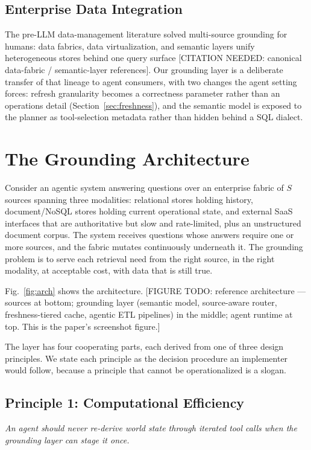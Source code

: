 \documentclass{ieeeaccess}
\begin{document}
\subsection{Enterprise Data Integration}
The pre-LLM data-management literature solved multi-source grounding for humans:
data fabrics, data virtualization, and semantic layers unify heterogeneous stores
behind one query surface [CITATION NEEDED: canonical data-fabric / semantic-layer
references]. Our grounding layer is a deliberate transfer of that lineage to agent
consumers, with two changes the agent setting forces: refresh granularity becomes a
correctness parameter rather than an operations detail (Section~\ref{sec:freshness}),
and the semantic model is exposed to the planner as tool-selection metadata rather
than hidden behind a SQL dialect.

\section{The Grounding Architecture}
\label{sec:framework}

Consider an agentic system answering questions over an enterprise fabric of $S$
sources spanning three modalities: relational stores holding history, document/NoSQL
stores holding current operational state, and external SaaS interfaces that are
authoritative but slow and rate-limited, plus an unstructured document corpus. The
system receives questions whose answers require one or more sources, and the fabric
mutates continuously underneath it. The grounding problem is to serve each retrieval
need from the right source, in the right modality, at acceptable cost, with data that
is still true.

Fig.~\ref{fig:arch} shows the architecture. [FIGURE TODO: reference architecture ---
sources at bottom; grounding layer (semantic model, source-aware router,
freshness-tiered cache, agentic ETL pipelines) in the middle; agent runtime at top.
This is the paper's screenshot figure.]

The layer has four cooperating parts, each derived from one of three design
principles. We state each principle as the decision procedure an implementer would
follow, because a principle that cannot be operationalized is a slogan.

\subsection{Principle 1: Computational Efficiency}
\label{sec:p1}
\emph{An agent should never re-derive world state through iterated tool calls when
the grounding layer can stage it once.}
\end{document}
